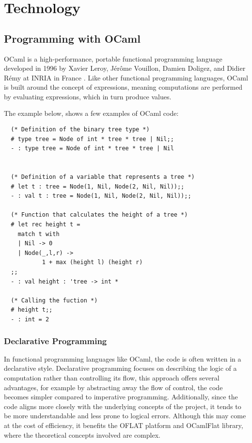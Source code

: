 

\chapter{Technology}
\label{cha:technology}

\section{Programming with OCaml}
\label{sec:declarative_code_in_ocaml}

OCaml is a high-performance, portable functional programming language developed in 1996 by Xavier Leroy, Jérôme Vouillon, Damien Doligez, and Didier Rémy at INRIA in France \cite{manuel}. Like other functional programming languages, OCaml is built around the concept of expressions, meaning computations are performed by evaluating expressions, which in turn produce values.

The example below, shows a few examples of OCaml code:

\begin{verbatim}
  (* Definition of the binary tree type *)
  # type tree = Node of int * tree * tree | Nil;;
  - : type tree = Node of int * tree * tree | Nil


  (* Definition of a variable that represents a tree *)
  # let t : tree = Node(1, Nil, Node(2, Nil, Nil));;
  - : val t : tree = Node(1, Nil, Node(2, Nil, Nil));;
  
  (* Function that calculates the height of a tree *)
  # let rec height t =
    match t with
    | Nil -> 0
    | Node(_,l,r) ->
           1 + max (height l) (height r)
  ;;
  - : val height : 'tree -> int *

  (* Calling the fuction *)
  # height t;;
  - : int = 2
\end{verbatim}


\subsection{Declarative Programming} 

In functional programming languages like OCaml, the code is often written in a declarative style. 
Declarative programming focuses on describing the logic of a computation rather than controlling its flow,
this approach offers several advantages, for example by abstracting away the flow of control, the code becomes simpler compared to 
imperative programming. 
Additionally, since the code aligns more closely with the underlying concepts of the project, it tends to be more understandable 
and less prone to logical errors. Although this may come at the cost of efficiency, it benefits the OFLAT platform and OCamlFlat library, 
where the theoretical concepts involved are complex.




